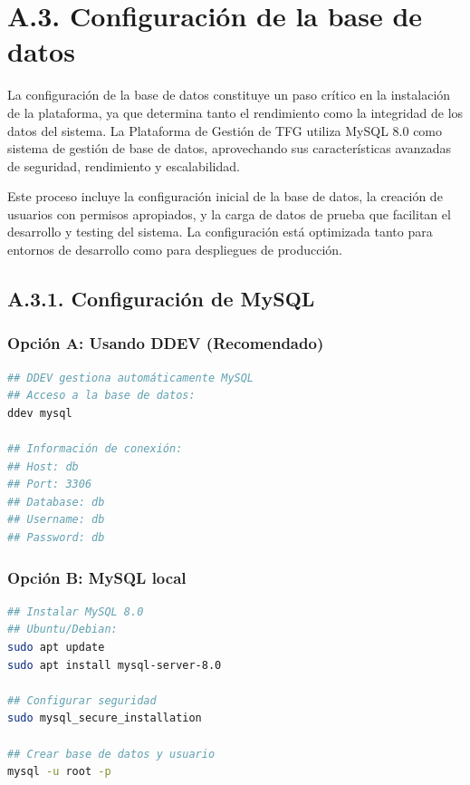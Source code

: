 \documentclass[12pt,a4paper,oneside]{report}
\begin{document}
\section{A.3. Configuración de la base de
datos}\label{a.3.-configuraciuxf3n-de-la-base-de-datos}

La configuración de la base de datos constituye un paso crítico en la
instalación de la plataforma, ya que determina tanto el rendimiento como
la integridad de los datos del sistema. La Plataforma de Gestión de TFG
utiliza MySQL 8.0 como sistema de gestión de base de datos, aprovechando
sus características avanzadas de seguridad, rendimiento y escalabilidad.

Este proceso incluye la configuración inicial de la base de datos, la
creación de usuarios con permisos apropiados, y la carga de datos de
prueba que facilitan el desarrollo y testing del sistema. La
configuración está optimizada tanto para entornos de desarrollo como
para despliegues de producción.

\subsection{A.3.1. Configuración de
MySQL}\label{a.3.1.-configuraciuxf3n-de-mysql}

\subsubsection{Opción A: Usando DDEV
(Recomendado)}\label{opciuxf3n-a-usando-ddev-recomendado}

\begin{lstlisting}[language=bash]
## DDEV gestiona automáticamente MySQL
## Acceso a la base de datos:
ddev mysql

## Información de conexión:
## Host: db
## Port: 3306  
## Database: db
## Username: db
## Password: db
\end{lstlisting}

\subsubsection{Opción B: MySQL local}\label{opciuxf3n-b-mysql-local}

\begin{lstlisting}[language=bash]
## Instalar MySQL 8.0
## Ubuntu/Debian:
sudo apt update
sudo apt install mysql-server-8.0

## Configurar seguridad
sudo mysql_secure_installation

## Crear base de datos y usuario
mysql -u root -p
\end{lstlisting}
\end{document}
